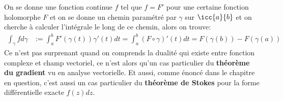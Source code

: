 \subsection*{}
On se donne une fonction continue \(f\) tel que \(f =  F'\) pour une certaine fonction holomorphe \(F\) et on se donne un chemin paramétré par \(\gamma\) sur \(\icc{a}{b}\) et on cherche à calculer l'intégrale le long de ce chemin, alors on trouve:
\begin{align*}
   \int_{\gamma} f d \gamma &:= \int_{a}^{b} F'(\gamma(t))\gamma'(t)d t = \int_{a}^{b} (F \circ \gamma)'(t) d t = F(\gamma(b)) - F(\gamma(a))
\end{align*}
Ce n'est pas surprenant quand on comprends la dualité qui existe entre fonction complexe et champ vectoriel, ce n'est alors qu'un cas particulier du \textbf{théorème du gradient} vu en analyse vectorielle. Et aussi, comme énoncé dans le chapitre en question, c'est aussi un cas particulier du \textbf{théorème de Stokes} pour la forme différentielle exacte \(f(z)dz\).
\chapter*{} %
\chapter*{} %
